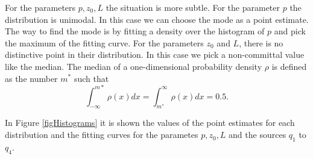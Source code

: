 \documentclass[12pt]{book}
\newcommand{\pars}{p,z_{0},L}
\begin{document}
For the parameters $\pars$ the situation is more subtle. For the parameter $p$
the distribution is unimodal. 
In this case we can choose the  mode as a point estimate.
The way to find the mode is by fitting a density over the histogram
of $p$ and pick the maximum of the fitting curve.
For the parameters $z_{0}$ and $L$, there is no distinctive point in
their distribution. In this case we pick a non-committal value like 
the median. The median of a one-dimensional probability density $\rho$ is defined
as the number $m^{*}$ such that 
\begin{equation*}
\int_{-\infty}^{m*}\rho(x)dx=\int_{m^{*}}^{\infty}\rho(x)dx=0.5.
\end{equation*}

In Figure \ref{figHistograms} it is shown the values of the point
estimates for each distribution and the fitting curves for the parametes $\pars$
and the sources $q_{1}$ to $q_{4}$.
\end{document}
